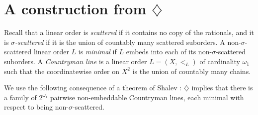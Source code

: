 \documentclass{amsart}
\numberwithin{equation}{section}
\theoremstyle{definition}
\theoremstyle{remark}
\begin{document}
\section{A construction from $\diamondsuit$}

Recall that a linear order is \emph{scattered} if it contains no copy
of the rationals, and it is \emph{$\sigma$-scattered} if it is the
union of countably many scattered suborders.  A non-$\sigma$-scattered
linear order $L$ is \emph{minimal} if $L$ embeds into each of its
non-$\sigma$-scattered suborders.  A \emph{Countryman line} is a linear
order $L=(X,<_{L})$ of cardinality $\omega_1$ such that the
coordinatewise order on $X^2$ is the union of countably many chains.

We use the following consequence of a theorem of Shalev
\cite[Corollary~1.2 and Remark~1.3]{Shalev2024}: $\diamondsuit$ implies
that there is a family of $2^{\omega_1}$ pairwise non-embeddable
Countryman lines, each minimal with respect to being
non-$\sigma$-scattered.
\end{document}
